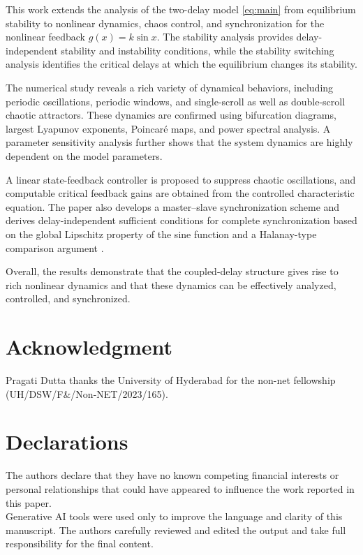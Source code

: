 \documentclass[11pt]{article}
\theoremstyle{remark}
\begin{document}
This work extends the analysis of the two-delay model \ref{eq:main} from equilibrium stability to nonlinear dynamics, chaos control, and synchronization for the nonlinear feedback $g(x)=k\sin x$. The stability analysis provides delay-independent stability and instability conditions, while the stability switching analysis identifies the critical delays at which the equilibrium changes its stability.

The numerical study reveals a rich variety of dynamical behaviors, including periodic oscillations, periodic windows, and single-scroll as well as double-scroll chaotic attractors. These dynamics are confirmed using bifurcation diagrams, largest Lyapunov exponents, Poincar\'e maps, and power spectral analysis. A parameter sensitivity analysis further shows that the system dynamics are highly dependent on the model parameters.

A linear state-feedback controller is proposed to suppress chaotic oscillations, and computable critical feedback gains are obtained from the controlled characteristic equation. The paper also develops a master--slave synchronization scheme and derives delay-independent sufficient conditions for complete synchronization based on the global Lipschitz property of the sine function and a Halanay-type comparison argument .

Overall, the results demonstrate that the coupled-delay structure gives rise to rich nonlinear dynamics and that these dynamics can be effectively analyzed, controlled, and synchronized. 

 
	\section*{Acknowledgment}	
Pragati Dutta thanks the University of Hyderabad for the non-net fellowship (UH/DSW/F\&/Non-NET/2023/165).

\section*{Declarations}
The authors declare that they have no known competing financial interests or personal relationships that could have appeared to influence the work reported in this paper.\\
Generative AI tools were used only to improve the language and 
clarity of this manuscript. The authors carefully reviewed and 
edited the output and take full responsibility for the final content.

	

\end{document}

